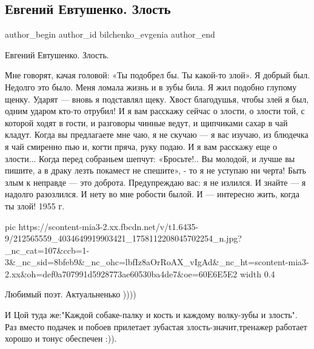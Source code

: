  
 
 
 
 
 
\subsection{Евгений Евтушенко. Злость}
\label{sec:04_07_2021.fb.bilchenko_evgenia.2.evtushenko_zlost}
\ifcmt
 author_begin
   author_id bilchenko_evgenia
 author_end
\fi

Евгений Евтушенко. Злость.

Мне говорят,
качая головой:
«Ты подобрел бы.
Ты какой-то злой».
Я добрый был.
Недолго это было.
Меня ломала жизнь
и в зубы била.
Я жил
подобно глупому щенку.
Ударят —
вновь я подставлял щеку.
Хвост благодушья,
чтобы злей я был,
одним ударом
кто-то отрубил!
И я вам расскажу сейчас
о злости,
о злости той,
с которой ходят в гости,
и разговоры
чинные ведут,
и щипчиками
сахар в чай кладут.
Когда вы предлагаете
мне чаю,
я не скучаю —
я вас изучаю,
из блюдечка
я чай смиренно пью
и, когти пряча,
руку подаю.
И я вам расскажу еще
о злости...
Когда перед собраньем шепчут:
«Бросьте!..
Вы молодой,
и лучше вы пишите,
а в драку лезть
покамест не спешите», -
то я не уступаю
ни черта!
Быть злым к неправде —
это доброта.
Предупреждаю вас:
я не излился.
И знайте —
я надолго разозлился.
И нету во мне
робости былой.
И —
интересно жить,
когда ты злой!
1955 г.

\ifcmt
  pic https://scontent-mia3-2.xx.fbcdn.net/v/t1.6435-9/212565559_4034649919903421_1758112208045702254_n.jpg?_nc_cat=107&ccb=1-3&_nc_sid=8bfeb9&_nc_ohc=lbfIz8aOrRoAX_vIgAd&_nc_ht=scontent-mia3-2.xx&oh=def0a707991d5928773ae60530ba4de7&oe=60E6E5E2
  width 0.4
\fi

\begin{itemize}
Любимый поэт.
Актуальненько ))))

И Цой туда же:"Каждой собаке-палку и кость и каждому волку-зубы и злость". Раз вместо подачек и побоев прилетает зубастая злость-значит,тренажер работает хорошо и тонус обеспечен :)).
\end{itemize}

